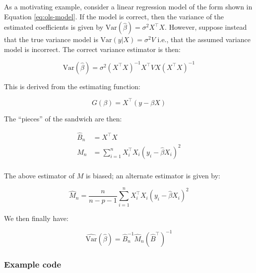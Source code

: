 \documentclass{report}
\begin{document}
As a motivating example, consider a linear regression model of the form shown in Equation \ref{eq:ols-model}. If the model is correct, then the variance of the estimated coefficients is given by $\text{Var}\left(\hat{\beta}\right) = \sigma^2X^\intercal X$. However, suppose instead that the true variance model is $\text{Var}(y | X) = \sigma^2 V$ i.e., that the assumed variance model is incorrect. The correct variance estimator is then:

\begin{equation}\label{eq:ols-sandwich-wrong-variance-1}
    \text{Var}\left(\hat{\beta}\right) = \sigma^2\left(X^\intercal X\right)^{-1} X^\intercal VX\left(X^\intercal X\right)^{-1}
\end{equation}

This is derived from the estimating function:

\begin{equation}\label{eq:ols-sandwich-wrong-variance-2}
    G(\beta) = X^\intercal(y - \beta X)
\end{equation}

The ``pieces'' of the sandwich are then:

\begin{equation}\label{eq:ols-sandwich-wrong-variance-3}
    \begin{aligned}
        \hat{B}_n &= X^\intercal X \\
        \hat{M}_n &= \sum_{i=1}^n X_i^\intercal X_i \left(y_i - \hat{\beta} X_i\right)^2 \\
    \end{aligned}
\end{equation}

The above estimator of $M$ is biased; an alternate estimator is given by:

\begin{equation}\label{eq:ols-sandwich-wrong-variance-4}
    \hat{M}_n = \frac{n}{n-p-1} \sum_{i=1}^n X_i^\intercal X_i \left(y_i - \hat{\beta} X_i\right)^2
\end{equation}

We then finally have:

\begin{equation}\label{eq:ols-sandwich-wrong-variance-5}
    \widehat{\text{Var}}\left(\hat{\beta}\right) = \hat{B}_n^{-1} \hat{M}_n \left(\hat{B}^\intercal\right)^{-1}
\end{equation}

\subsubsection{Example code}
\end{document}
